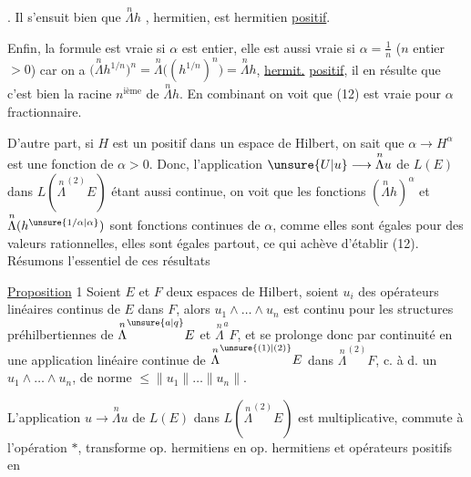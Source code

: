 . Il s'ensuit bien que $\overset{n}{\Lambda}h$ ,   hermitien, est hermitien \uline{positif}.

Enfin, la formule  est vraie si $\alpha$ est entier, elle est aussi vraie si $\alpha=\frac1n$ ($n$ entier $>0$) car on a $\bigl(\overset{n}{\Lambda}h^{1/n}\bigr)^n=\overset{n}{\Lambda}\bigl((h^{1/n})^n\bigr)=\overset{n}{\Lambda}h$,   \uline{hermit.} \uline{positif}, il en résulte que c'est bien la racine $n^{\text{ième}}$ de $\overset{n}{\Lambda}h$.  En combinant on voit que (12) est vraie pour $\alpha$ fractionnaire.

D'autre part, si $H$ est un  positif dans un espace de Hilbert, on sait que $\alpha\longrightarrow H^\alpha$ est une fonction  de $\alpha>0$.  Donc, l'application $\unsure{U|u}\longrightarrow\overset{n}{\Lambda}u$ de $L(E)$ dans $L(\overset{n}{\Lambda}^{(2)}E)$ étant aussi continue, on voit que les fonctions $(\overset{n}{\Lambda}h)^\alpha$ et $\overset{n}{\Lambda}(h^{\unsure{1/\alpha|\alpha}})$ sont fonctions continues de $\alpha$,  comme elles sont égales pour des valeurs rationnelles, elles sont égales partout, ce qui achève d'établir (12). Résumons l'essentiel de ces résultats

\uline{Proposition} 1 Soient $E$ et $F$ deux espaces de Hilbert, soient $u_i$   des opérateurs linéaires continus de $E$ dans $F$, alors $u_1\wedge\ldots\wedge u_n$ est continu pour les structures préhilbertiennes de $\overset{n}{\Lambda}^{\unsure{a|q}}E$ et $\overset{n}{\Lambda}^{a}F$, et se prolonge donc par continuité en une application linéaire continue de $\overset{n}{\Lambda}^{\unsure{(1)|(2)}}E$ dans $\overset{n}{\Lambda}^{(2)}F$,  c. à d. un $u_1\wedge\ldots\wedge u_n$,  de norme $\leq\lVert u_1\rVert\ldots\lVert u_n\rVert$.

L'application $u\longrightarrow\overset{n}{\Lambda}u$ de $L(E)$ dans $L(\overset{n}{\Lambda}^{(2)}E)$ est multiplicative, commute à l'opération $*$, transforme op. hermitiens en op. hermitiens et opérateurs positifs en

